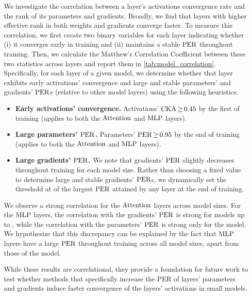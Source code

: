 \begin{result}
We investigate the correlation between a layer's activations convergence rate and the rank of its parameters and gradients. Broadly, we find that layers with higher effective rank in both weights and gradients converge faster.
To measure this correlation, we first create two binary variables for each layer indicating whether (i) it converges early in training and (ii) maintains a stable $\mathrm{PER}$ throughout training. Then, we calculate the Matthew's Correlation Coefficient between these two statistics across layers and report them in \cref{tab:model_correlation}.
Specifically, for each layer of a given model, we determine whether that layer exhibits early activations' convergence and large and stable parameters' and gradients' $\mathrm{PER}$s (relative to other model layers) using the following heuristics: 
\begin{itemize}
    \item \textbf{Early activations' convergence.} Activations' $\cka \mathop{\geq} \float[2]{0.45}$ by the first  of training (applies to both the $\mathrm{Attention}$ and $\mathrm{MLP}$ layers).
    
    \item \textbf{Large parameters' $\mathrm{PER}$.} Parameters' $\per \mathop{\geq} \float[2]{0.95}$ by the end of training (applies to both the $\mathrm{Attention}$ and $\mathrm{MLP}$ layers).
    
    \item \textbf{Large gradients' $\mathrm{PER}$.} We note that gradients' $\mathrm{PER}$ slightly decreases throughout training for each model size. Rather than choosing a fixed value to determine large and stable gradients' $\mathrm{PER}$s, we dynamically set the threshold at  of the largest $\mathrm{PER}$ attained by any layer at the end of training.
\end{itemize}
We observe a strong correlation for the $\mathrm{Attention}$ layers across model sizes. For the $\mathrm{MLP}$ layers, the correlation with the gradients' $\mathrm{PER}$ is strong for models up to \onebil, while the correlation with the parameters' $\mathrm{PER}$ is strong only for the \sevenmil model. We hypothesize that this discrepancy can be explained by the fact that $\mathrm{MLP}$ layers have a large $\mathrm{PER}$ throughout training across all model sizes, apart from those of the \sevenmil model. 

While these results are correlational, they provide a foundation for future work to test whether methods that specifically increase the PER of layers' parameters and gradients induce faster convergence of the layers' activations in small models.
\end{result}

